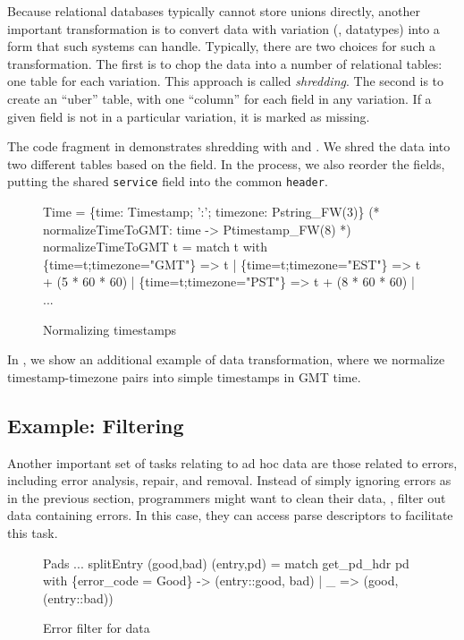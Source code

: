 Because relational databases typically cannot store unions directly,
another important transformation is to convert data with variation
(\ie{}, datatypes) into a form that such systems can handle.
Typically, there are two choices for such a transformation.  The first
is to chop the data into a number of relational tables: one table for
each variation.  This approach is called \textit{shredding}. The
second is to create an ``uber'' table, with one ``column'' for each
field in any variation.  If a given field is not in a particular
variation, it is marked as missing. 

The code fragment in  demonstrates
shredding with \padsml{} and \ocaml{}. We shred the data into two
different tables based on the  field. In the process, we also
reorder the fields, putting the shared \texttt{service} field into
the common \texttt{header}.

\begin{figure}
  \centering
  \begin{code}\scriptsize
{} Time = \{time: Timestamp;
               ':'; timezone: Pstring_FW(3)\}
\mbox{}
(* normalizeTimeToGMT: time -> Ptimestamp_FW(8) *)
 normalizeTimeToGMT t = 
    match t with
      \{time=t;timezone="GMT"\} => t
    | \{time=t;timezone="EST"\} => t + (5 * 60 * 60)
    | \{time=t;timezone="PST"\} => t + (8 * 60 * 60)
    | ... \end{code}
  \caption{Normalizing timestamps}
  \label{fig:ex-normalize}
\end{figure}

In , we show an additional example of data
transformation, where we normalize timestamp-timezone pairs into
simple timestamps in GMT time.

\subsection{Example: Filtering}
\label{sec:ex-filter}

Another important set of tasks relating to ad hoc data are those
related to errors, including error analysis, repair, and removal.
Instead of simply ignoring errors as in the previous section,
programmers might want to clean their data, \ie{}, filter out data
containing errors. In this case, they can access parse descriptors to
facilitate this task.

\begin{figure}
\begin{code}\scriptsize
{} Pads
   ...
 splitEntry (good,bad) (entry,pd) =
   match get\_pd\_hdr pd with
     \{error_code = Good\} -> (entry::good, bad)
   | _ => (good, (entry::bad))\end{code}
\caption{Error filter for \dibbler{} data}
\label{fig:ex-data-clean}
\end{figure}


